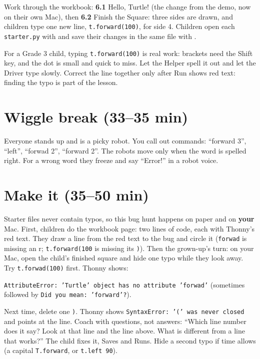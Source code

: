 Work through the workbook: \textbf{6.1} Hello, Turtle! (the change from the demo, now on their own Mac), then \textbf{6.2} Finish the Square: three sides are drawn, and children type one new line, \texttt{t.forward(100)}, for side 4. Children open each \texttt{starter.py} with  and save their changes in the same file with .

\begin{tip}
For a Grade 3 child, typing \texttt{t.forward(100)} is real work: brackets need the Shift key, and the dot is small and quick to miss. Let the Helper spell it out and let the Driver type slowly. Correct the line together only after Run shows red text: finding the typo is part of the lesson.
\end{tip}

\section{Wiggle break (33--35 min)}
Everyone stands up and is a picky robot. You call out commands: \enquote{forward 3}, \enquote{left}, \enquote{forwad 2}, \enquote{forward 2}. The robots move only when the word is spelled right. For a wrong word they freeze and say \enquote{Error!} in a robot voice.

\section{Make it (35--50 min)}
\begin{bughunt}
Starter files never contain typos, so this bug hunt happens on paper and on \textbf{your} Mac. First, children do the workbook page: two lines of code, each with Thonny's red text. They draw a line from the red text to the bug and circle it (\texttt{forwad} is missing an r; \texttt{t.forward(100} is missing its \texttt{)}). Then the grown-up's turn: on your Mac, open the child's finished square and hide one typo while they look away. Try \texttt{t.forwad(100)} first. Thonny shows:

\texttt{AttributeError: 'Turtle' object has no attribute 'forwad'} (sometimes followed by \texttt{Did you mean: 'forward'?}).

Next time, delete one \texttt{)}. Thonny shows \texttt{SyntaxError: '(' was never closed} and points at the line. Coach with questions, not answers: \enquote{Which line number does it say? Look at that line and the line above. What is different from a line that works?} The child fixes it, Saves and Runs. Hide a second typo if time allows (a capital \texttt{T.forward}, or \texttt{t.left 90}).
\end{bughunt}


